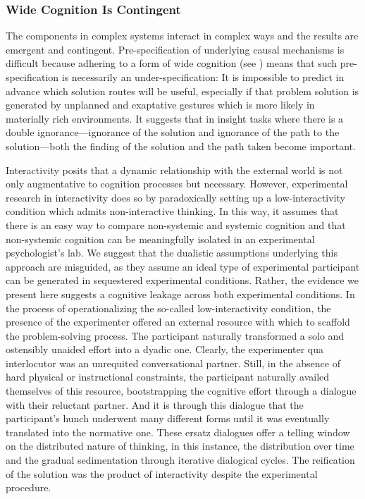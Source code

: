 \documentclass{article}
\begin{document}
\subsubsection{Wide Cognition Is Contingent}

The components in complex systems interact in complex ways and the results are emergent and contingent. Pre-specification of underlying causal mechanisms is difficult because adhering to a form of wide cognition (see \parencite{Wilson2009}) means that such pre-specification is necessarily an under-specification: It is impossible to predict in advance which solution routes will be useful, especially if that problem solution is generated by unplanned and exaptative gestures which is more likely in materially rich environments. It suggests that in insight tasks where there is a double ignorance—ignorance of the solution and ignorance of the path to the solution—both the finding of the solution and the path taken become important. 

Interactivity posits that a dynamic relationship with the external world is not only augmentative to cognition processes but necessary. However, experimental research in interactivity does so by paradoxically setting up a low-interactivity condition which admits non-interactive thinking. In this way, it assumes that there is an easy way to compare non-systemic and systemic cognition and that non-systemic cognition can be meaningfully isolated in an experimental psychologist's lab. We suggest that the dualistic assumptions underlying this approach are misguided, as they assume an ideal type of experimental participant can be generated in sequestered experimental conditions. Rather, the evidence we present here suggests a cognitive leakage across both experimental conditions. In the process of operationalizing the so-called low-interactivity condition, the presence of the experimenter offered an external resource with which to scaffold the problem-solving process. The participant naturally transformed a solo and ostensibly unaided effort into a dyadic one. Clearly, the experimenter qua interlocutor was an unrequited conversational partner. Still, in the absence of hard physical or instructional constraints, the participant naturally availed themselves of this resource, bootstrapping the cognitive effort through a dialogue with their reluctant partner. And it is through this dialogue that the participant's hunch underwent many different forms until it was eventually translated into the normative one. These ersatz dialogues offer a telling window on the distributed nature of thinking, in this instance, the distribution over time and the gradual sedimentation through iterative dialogical cycles. The reification of the solution was the product of interactivity despite the experimental procedure.
\end{document}
